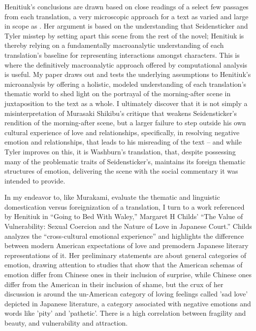\documentclass[12pt]{article}
\begin{document}
\begin{flushleft}
\begin{spacing}{2.0}
Henitiuk's conclusions are drawn based on close readings of a select few passages from each translation, a very microscopic approach for a text as varied and large in scope as . Her argument is based on the understanding that Seidensticker and Tyler misstep by setting apart this scene from the rest of the novel; Henitiuk is thereby relying on a fundamentally macroanalytic understanding of each translation's baseline for representing interactions amongst characters. This is where the definitively macroanalytic approach offered by computational analysis is useful. My paper draws out and tests the underlying assumptions to Henitiuk's microanalysis by offering a holistic, modeled understanding of each translation's thematic world to shed light on the portrayal of the morning-after scene in juxtaposition to the text as a whole. I ultimately discover that it is not simply a misinterpretation of Murasaki Shikibu's critique that weakens Seidensticker's rendition of the morning-after scene, but a larger failure to step outside his own cultural experience of love and relationships, specifically, in resolving negative emotion and relationships, that leads to his misreading of the text -- and while Tyler improves on this, it is Washburn's translation, that, despite possessing many of the problematic traits of Seidensticker's, maintains its foreign thematic structures of emotion, delivering the scene with the social commentary it was intended to provide.

In my endeavor to, like Murakami, evaluate the thematic and linguistic domestication versus foreignization of a translation, I turn to a work referenced by Henitiuk in ``Going to Bed With Waley,'' Margaret H Childs' ``The Value of Vulnerability: Sexual Coercion and the Nature of Love in Japanese Court.'' Childs analyzes the ``cross-cultural emotional experience'' and highlights the difference between modern American expectations of love and premodern Japanese literary representations of it. Her preliminary statements are about general categories of emotion, drawing attention to studies that show that the American schemas of emotion differ from Chinese ones in their inclusion of surprise, while Chinese ones differ from the American in their inclusion of shame, but the crux of her discussion is around the un-American category of loving feelings called 'sad love' depicted in Japanese literature, a category associated with negative emotions and words like 'pity' and 'pathetic'. There is a high correlation between fragility and beauty, and vulnerability and attraction.


\end{spacing}
\end{flushleft}
\end{document}
